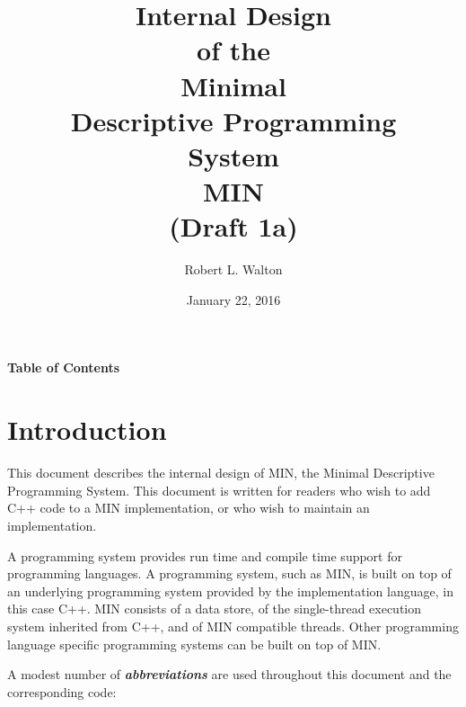 \documentclass[12pt]{article}
\makeatletter
\renewcommand\tableofcontents{%
    \begin{list}{}%
	     {\setlength{\itemsep}{0in}%
	      \setlength{\topsep}{0in}%
	      \setlength{\parsep}{1ex}%
	      \setlength{\labelwidth}{0in}%
	      \setlength{\baselineskip}{1.5ex}%
	      \setlength{\leftmargin}{0.8in}%
	      \setlength{\rightmargin}{0.8in}}%
    \item\@starttoc{toc}%
    \end{list}}
\newcommand{\skey}[2]{{\bf \em #1#2}\index{#1}}
\makeatother
\begin{document}
        
\title{Internal Design\\[2ex]of the\\[2ex]
       Minimal\\Descriptive Programming\\System\\[2ex]MIN\\[2ex]
       (Draft 1a)}

\author{Robert L. Walton}

\date{January 22, 2016}
 
\maketitle

\newpage
\begin{center}
\large \bf Table of Contents
\end{center}

\bigskip

\tableofcontents 

\newpage

\section{Introduction}

This document describes the internal design of MIN,
the Minimal Descriptive Programming System.
This document is written for readers who wish to add C++ code
to a MIN implementation, or who wish to maintain an implementation.

A programming system provides run time and compile time support
for programming languages.
A programming system, such as MIN, is
built on top of an underlying programming system provided by the
implementation language, in this case C++.
MIN consists of a data store, of the single-thread execution system
inherited from C++, and of MIN compatible threads.
Other programming language specific
programming systems can be built on top of MIN.

A modest number of \skey{abbreviation}s are used throughout this document
and the corresponding code:
\end{document}

